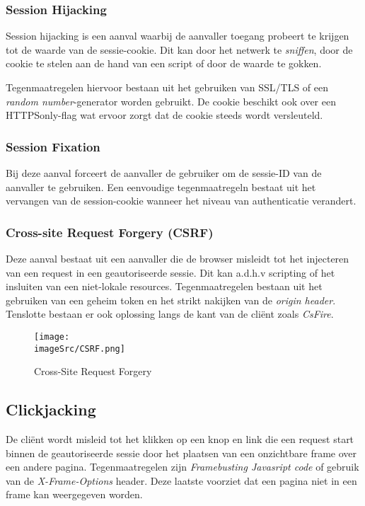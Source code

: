 \documentclass[../main.tex]{subfiles}
\begin{document}
\subsubsection{Session Hijacking}
Session hijacking is een aanval waarbij de aanvaller toegang probeert te krijgen tot de waarde van de sessie-cookie. Dit kan door het netwerk te \textit{sniffen}, door de cookie te stelen aan de hand van een script of door de waarde te gokken. 

Tegenmaatregelen hiervoor bestaan uit het gebruiken van SSL/TLS of een \textit{random number}-generator worden gebruikt. De cookie beschikt ook over een HTTPSonly-flag wat ervoor zorgt dat de cookie steeds wordt versleuteld. 

\subsubsection{Session Fixation}
Bij deze aanval forceert de aanvaller de gebruiker om de sessie-ID van de aanvaller te gebruiken. Een eenvoudige tegenmaatregeln bestaat uit het vervangen van de session-cookie wanneer het niveau van authenticatie verandert.

\subsubsection{Cross-site Request Forgery (CSRF)}
Deze aanval bestaat uit een aanvaller die de browser misleidt tot het injecteren van een request in een geautoriseerde sessie. Dit kan a.d.h.v scripting of het insluiten van een niet-lokale resources. Tegenmaatregelen bestaan uit het gebruiken van een geheim token en het strikt nakijken van de \textit{origin header}. Tenslotte bestaan er ook oplossing langs de kant van de cli\"ent zoals \textit{CsFire}.

\begin{figure}[h!]
    \centering
    \texttt{[image: \\imageSrc/CSRF.png]}
    \caption{Cross-Site Request Forgery}
    \label{fig:awesome_image}
\end{figure}

\subsection{Clickjacking}
De cli\"ent wordt misleid tot het klikken op een knop en link die een request start binnen de geautoriseerde sessie door het plaatsen van een onzichtbare frame over een andere pagina. Tegenmaatregelen zijn \textit{Framebusting Javasript code} of gebruik van de \textit{X-Frame-Options} header. Deze laatste voorziet dat een pagina niet in een frame kan weergegeven worden.
\end{document}
